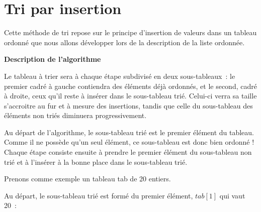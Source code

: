 \section{Tri par insertion}

	Cette méthode de tri repose sur le principe d’insertion de valeurs dans
	un tableau ordonné que nous allons développer lors de la description de
	la liste ordonnée. 

	{\sffamily\bfseries\upshape
	Description de l’algorithme}

	Le tableau à trier sera à chaque étape subdivisé en deux sous-tableaux~:
	le premier cadré à gauche contiendra des éléments déjà ordonnés, et le
	second, cadré à droite, ceux qu’il reste à insérer dans le sous-tableau
	trié. Celui-ci verra sa taille s’accroitre au fur et à mesure des
	insertions, tandis que celle du sous-tableau des éléments non triés
	diminuera progressivement.

	Au départ de l’algorithme, le sous-tableau trié est le premier élément
	du tableau. Comme il ne possède qu’un seul élément, ce sous-tableau est
	donc bien ordonné ! Chaque étape consiste ensuite à prendre le premier
	élément du sous-tableau non trié et à l’insérer à la bonne place dans
	le sous-tableau trié.

	Prenons comme exemple un tableau tab de 20 entiers. 
	
	Au départ, le	sous-tableau trié est formé du premier élément, 
	$tab[1]$ qui vaut 20~:


